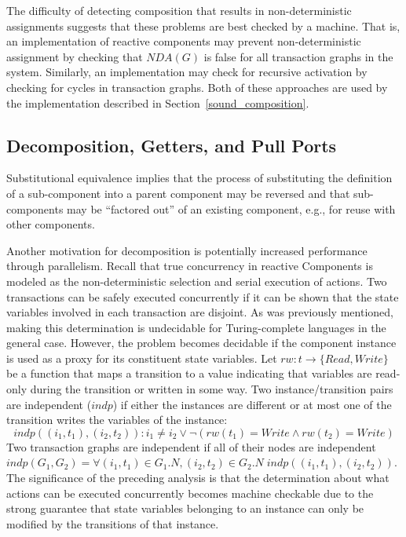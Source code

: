 The difficulty of detecting composition that results in non-deterministic assignments suggests that these problems are best checked by a machine.
That is, an implementation of reactive components may prevent non-deterministic assignment by checking that $\mathit{NDA}(G)$ is false for all transaction graphs in the system.
Similarly, an implementation may check for recursive activation by checking for cycles in transaction graphs.
Both of these approaches are used by the implementation described in Section~\ref{sound_composition}.

\subsection{Decomposition, Getters, and Pull Ports}
\label{decomposition}
Substitutional equivalence implies that the process of substituting the definition of a sub-component into a parent component may be reversed and that sub-components may be ``factored out'' of an existing component, e.g., for reuse with other components.

Another motivation for decomposition is potentially increased performance through parallelism.
Recall that true concurrency in reactive Components is modeled as the non-deterministic selection and serial execution of actions.
Two transactions can be safely executed concurrently if it can be shown that the state variables involved in each transaction are disjoint.
As was previously mentioned, making this determination is undecidable for Turing-complete languages in the general case.
However, the problem becomes decidable if the component instance is used as a proxy for its constituent state variables.
Let $\mathit{rw}: t \to \{ \mathit{Read}, \mathit{Write} \}$ be a function that maps a transition to a value indicating that variables are read-only during the transition or written in some way.
Two instance/transition pairs are independent ($\mathit{indp}$) if either the instances are different or at most one of the transition writes the variables of the instance:
\begin{equation}
\mathit{indp}((i_1, t_1), (i_2, t_2)): i_1 \ne i_2 \lor \lnot (\mathit{rw}(t_1) = \mathit{Write} \land \mathit{rw}(t_2) = \mathit{Write})
\end{equation}
Two transaction graphs are independent if all of their nodes are independent $\mathit{indp}(G_1, G_2) = \forall (i_1, t_1) \in G_1.N, (i_2, t_2) \in G_2.N \; \mathit{indp}((i_1, t_1), (i_2, t_2))$.
The significance of the preceding analysis is that the determination about what actions can be executed concurrently becomes machine checkable due to the strong guarantee that state variables belonging to an instance can only be modified by the transitions of that instance.

